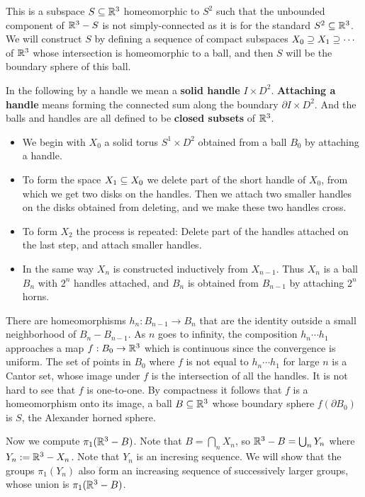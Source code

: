 \begin{example}
This is a subspace $S\subseteq\mathbb{R}^3$ homeomorphic to $S^2$ such that the unbounded component of $\mathbb{R}^3-S$ is not simply-connected as it is for the standard $S^2\subseteq\mathbb{R}^3$. We will construct $S$ by defining a sequence of compact subspaces $X_0\supseteq X_1\supseteq \cdots$ of $\mathbb{R}^3$ whose intersection is homeomorphic to a ball, and then $S$ will be the boundary sphere of this ball.\par
In the following by a handle we mean a \textbf{solid handle} $I\times D^2$. \textbf{Attaching a handle} means forming the connected sum along the boundary $\partial I\times D^2$. And the balls and handles are all defined to be  \textbf{closed subsets} of $\mathbb{R}^3$.
\begin{itemize}
\item We begin with $X_0$ a solid torus $S^1\times D^2$ obtained from a ball $B_0$ by attaching a handle.
\item To form the space $X_1\subseteq X_0$ we delete part of the short handle of $X_0$, from which we get two disks on the handles. Then we attach two smaller handles on the disks obtained from deleting, and we make these two handles cross. 
\item To form $X_2$ the process is repeated: Delete part of the handles attached on the last step, and attach smaller handles.
\item In the same way $X_n$ is constructed inductively from $X_{n-1}$. Thus $X_n$ is a ball $B_n$ with $2^n$ handles attached, and $B_n$ is obtained from $B_{n-1}$ by attaching $2^n$ horns.
\end{itemize}
There are homeomorphisms $h_n:B_{n-1}\to B_n$ that are the identity outside a small neighborhood of $B_n-B_{n-1}$. As $n$ goes to infinity, the composition $h_n\cdots h_1$ approaches a map $f:B_0\to\mathbb{R}^3$ which is continuous since the convergence is uniform. The set of points in $B_0$ where $f$ is not equal to $h_n\cdots h_1$ for large $n$ is a Cantor set, whose image under $f$ is the intersection of all the handles. It is not hard to see that $f$ is one-to-one. By compactness it follows that $f$ is a homeomorphism onto its image, a ball $B\subseteq\mathbb{R}^3$ whose boundary sphere $f(\partial B_0)$ is $S$, the Alexander horned sphere.\par
Now we compute $\pi_1(\mathbb{R}^3-B)$. Note that $B=\bigcap_nX_n$, so $\mathbb{R}^3-B=\bigcup_nY_n$ where $Y_n:=\mathbb{R}^3-X_n$. Note that $Y_n$ is an incresing sequence. We will show that the groups $\pi_1(Y_n)$ also form an increasing sequence of successively larger groups, whose union is $\pi_1(\mathbb{R}^3-B)$.

\end{example}
